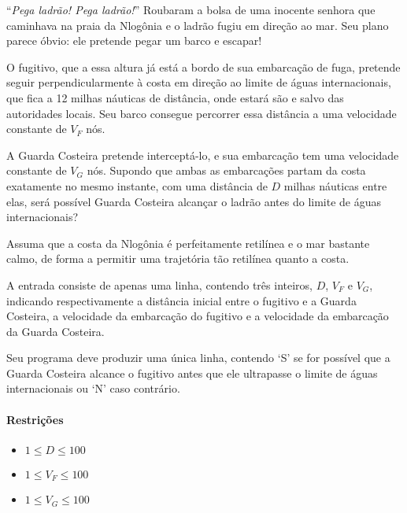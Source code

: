 %
%
%
%

``\emph{Pega ladrão! Pega ladrão!}'' Roubaram a bolsa de uma inocente senhora que caminhava na praia da Nlogônia e o ladrão fugiu em direção ao mar. Seu plano parece óbvio: ele pretende pegar um barco e escapar!

O fugitivo, que a essa altura já está a bordo de sua embarcação de fuga, pretende seguir perpendicularmente à costa em direção ao limite de águas internacionais, que fica a 12 milhas náuticas de distância, onde estará são e salvo das autoridades locais. Seu barco consegue percorrer essa distância a uma velocidade constante de $V_F$ nós.

A Guarda Costeira pretende interceptá-lo, e sua embarcação tem uma velocidade constante de $V_G$ nós. Supondo que ambas as embarcações partam da costa exatamente no mesmo instante, com uma distância de $D$ milhas náuticas entre elas, será possível Guarda Costeira alcançar o ladrão antes do limite de águas internacionais?

Assuma que a costa da Nlogônia é perfeitamente retilínea e o mar bastante calmo, de forma a permitir uma trajetória tão retilínea quanto a costa.

\Entrada%
A entrada consiste de apenas uma linha, contendo três inteiros, $D$, $V_F$ e $V_G$, indicando respectivamente a distância inicial entre o fugitivo e a Guarda Costeira, a velocidade da embarcação do fugitivo e a velocidade da embarcação da Guarda Costeira.

\Saida%
Seu programa deve produzir uma única linha, contendo ‘S’ se for possível que a Guarda Costeira alcance o fugitivo antes que ele ultrapasse o limite de águas internacionais ou `N' caso contrário.

\paragraph{Restrições}%
\begin{itemize}
	\item $1 \leq D \leq 100$
	\item $1 \leq V_F \leq 100$
	\item $1 \leq V_G \leq 100$
\end{itemize}

%
